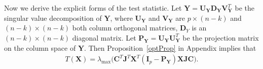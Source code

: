 \documentclass[12pt]{article} %
\newcommand{\bX}{\mathbf{X}}
\newcommand{\bP}{\mathbf{P}}
\newcommand{\bY}{\mathbf{Y}}
\newcommand{\bJ}{\mathbf{J}}
\newcommand{\bC}{\mathbf{C}}
\newcommand{\bI}{\mathbf{I}}
\newcommand{\bU}{\mathbf{U}}
\newcommand{\bD}{\mathbf{D}}
\newcommand{\bV}{\mathbf{V}}
\theoremstyle{definition}
\begin{document}
Now we derive the explicit forms of the test statistic. 
Let $\bY=\bU_{\bY}\bD_{\bY}\bV_{\bY}^T$ be the singular value decomposition of $\bY$, where $\bU_{\bY}$ and $\bV_{\bY}$ are $p\times (n-k)$ and $(n-k)\times(n-k)$ both column orthogonal matrices, $\bD_{Y}$ is an $(n-k)\times (n-k)$ diagonal matrix.
Let $\bP_{\bY}=\bU_{\bY}\bU_{\bY}^T$ be the projection matrix on the column space of $\bY$.
Then Proposition~\ref{optProp} in Appendix implies that
\begin{equation}\label{statisticForm1}
\begin{aligned}
    T(\bX)
    =\lambda_{\max}\big(\bC^T\bJ^T\bX^T (\bI_p-
    \bP_{\bY}
    )\bX\bJ\bC\big).
\end{aligned}
\end{equation}
\end{document}

